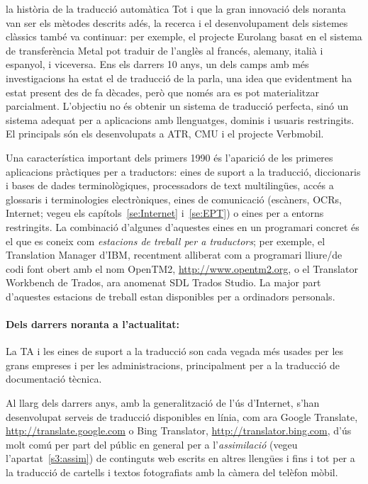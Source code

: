 \begin{persabermes}{la història de la traducció automàtica}
  Tot i que la gran innovació dels noranta van ser els mètodes
  descrits adés, la recerca i el desenvolupament dels sistemes
  clàssics també va continuar: per exemple, el projecte Eurolang basat
  en el sistema de transferència Metal pot traduir de l'anglès al
  francés, alemany, italià i espanyol, i viceversa.  Ens els darrers
  10 anys, un dels camps amb més investigacions ha estat el de
  traducció de la parla, una idea que evidentment ha estat present des
  de fa dècades, però que només ara es pot materialitzar parcialment.
  L'objectiu no és obtenir un sistema de traducció perfecta, sinó un
  sistema adequat per a aplicacions amb llenguatges, dominis i usuaris
  restringits. El principals són els desenvolupats a ATR, CMU i el
  projecte Verbmobil.

  Una característica important dels primers 1990 és l'aparició de les
  primeres aplicacions pràctiques per a traductors: eines de suport a
  la traducció, diccionaris i bases de dades terminològiques,
  processadors de text multilingües, accés a glossaris i terminologies
  electròniques, eines de comunicació (escàners, OCRs, Internet; vegeu
  els capítols~\ref{se:Internet} i~\ref{se:EPT}) o eines per a entorns
  restringits.  La combinació d'algunes d'aquestes eines en un
  programari concret és el que es coneix com \emph{estacions de
    treball per a traductors}; per exemple, el Translation Manager
  d'IBM, recentment alliberat com a programari lliure/de codi font
  obert amb el nom OpenTM2, \url{http://www.opentm2.org}, o el
  Translator Workbench de Trados, ara anomenat SDL Trados Studio. La
  major part d'aquestes estacions de treball estan disponibles per a
  ordinadors personals.

  \paragraph{Dels darrers noranta a l'actualitat:}
  La TA i les eines de suport a la traducció son cada vegada més
  usades per les grans empreses i per les administracions,
  principalment per a la traducció de documentació tècnica.

  Al llarg dels darrers anys, amb la generalització de l'ús
  d'Internet, s'han desenvolupat serveis de traducció disponibles en
  línia, com ara Google Translate, \url{http://translate.google.com} o
  Bing Translator, \url{http://translator.bing.com}, d'ús molt comú
  per part del públic en general per a l'\emph{assimilació} (vegeu
  l'apartat~\ref{s3:assim}) de continguts web escrits en altres
  llengües i fins i tot per a la traducció de cartells i textos
  fotografiats amb la càmera del telèfon mòbil.


\end{persabermes}
